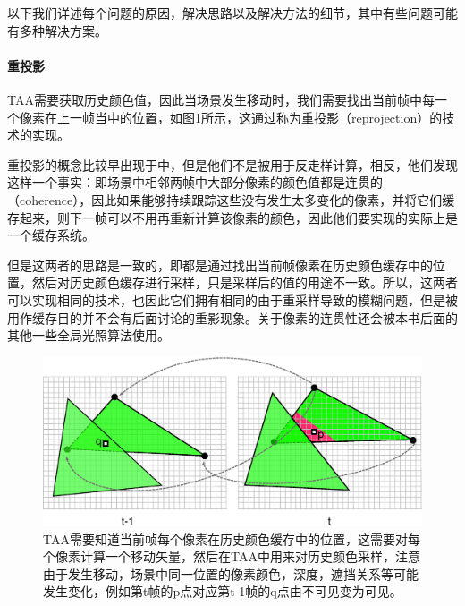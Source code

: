 以下我们详述每个问题的原因，解决思路以及解决方法的细节，其中有些问题可能有多种解决方案。







\paragraph{重投影}
TAA需要获取历史颜色值，因此当场景发生移动时，我们需要找出当前帧中每一个像素在上一帧当中的位置，如图\ref{f:shade-reprojection}所示，这通过称为重投影（reprojection）的技术的实现。

\begin{shaded*}
	重投影的概念比较早出现于\cite{a:AcceleratingReal-TimeShadingwithReverseReprojectionCaching,a:PixelCorrectShadowMapswithTemporalReprojectionandShadowTestConfidence}中，但是他们不是被用于反走样计算，相反，他们发现这样一个事实：即场景中相邻两帧中大部分像素的颜色值都是连贯的（coherence），因此如果能够持续跟踪这些没有发生太多变化的像素，并将它们缓存起来，则下一帧可以不用再重新计算该像素的颜色，因此他们要实现的实际上是一个缓存系统。
	
	但是这两者的思路是一致的，即都是通过找出当前帧像素在历史颜色缓存中的位置，然后对历史颜色缓存进行采样，只是采样后的值的用途不一致。所以，这两者可以实现相同的技术，也因此它们拥有相同的由于重采样导致的模糊问题，但是被用作缓存目的并不会有后面讨论的重影现象。关于像素的连贯性还会被本书后面的其他一些全局光照算法使用。
\end{shaded*}

\begin{figure}
	\includegraphics[width=\textwidth]{figures/shade/reprojection}
	\caption{TAA需要知道当前帧每个像素在历史颜色缓存中的位置，这需要对每个像素计算一个移动矢量，然后在TAA中用来对历史颜色采样，注意由于发生移动，场景中同一位置的像素颜色，深度，遮挡关系等可能发生变化，例如第t帧的p点对应第t-1帧的q点由不可见变为可见。}
	\label{f:shade-reprojection}
\end{figure}

